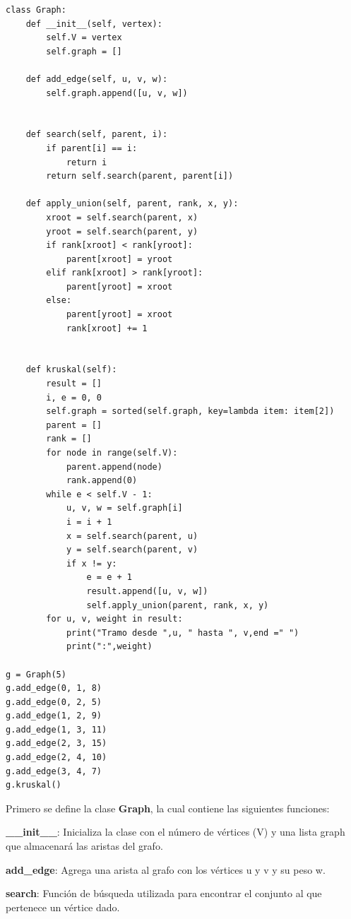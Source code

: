 \documentclass[12pt,a4paper]{article}
\begin{document}
\begin{lstlisting}[caption={Algoritmo de Kruskal en Python}, label={lst:python}]
    class Graph:
    def __init__(self, vertex):
        self.V = vertex
        self.graph = []
 
    def add_edge(self, u, v, w):
        self.graph.append([u, v, w])
 
 
    def search(self, parent, i):
        if parent[i] == i:
            return i
        return self.search(parent, parent[i])
 
    def apply_union(self, parent, rank, x, y):
        xroot = self.search(parent, x)
        yroot = self.search(parent, y)
        if rank[xroot] < rank[yroot]:
            parent[xroot] = yroot
        elif rank[xroot] > rank[yroot]:
            parent[yroot] = xroot
        else:
            parent[yroot] = xroot
            rank[xroot] += 1
 
  
    def kruskal(self):
        result = []
        i, e = 0, 0
        self.graph = sorted(self.graph, key=lambda item: item[2])
        parent = []
        rank = []
        for node in range(self.V):
            parent.append(node)
            rank.append(0)
        while e < self.V - 1:
            u, v, w = self.graph[i]
            i = i + 1
            x = self.search(parent, u)
            y = self.search(parent, v)
            if x != y:
                e = e + 1
                result.append([u, v, w])
                self.apply_union(parent, rank, x, y)
        for u, v, weight in result:
            print("Tramo desde ",u, " hasta ", v,end =" ")
            print(":",weight)
 
g = Graph(5)
g.add_edge(0, 1, 8)
g.add_edge(0, 2, 5)
g.add_edge(1, 2, 9)
g.add_edge(1, 3, 11)
g.add_edge(2, 3, 15)
g.add_edge(2, 4, 10)
g.add_edge(3, 4, 7)
g.kruskal()

\end{lstlisting}

Primero se define la clase \textbf{Graph}, la cual contiene las siguientes funciones:
\newline

\textbf{\_\_init\_\_}: Inicializa la clase con el número de vértices (V) y una lista graph que almacenará las aristas del grafo.
\newline

\textbf{add\_edge}: Agrega una arista al grafo con los vértices u y v y su peso w.
\newline

\textbf{search}: Función de búsqueda utilizada para encontrar el conjunto al que pertenece un vértice dado.
\newline
\end{document}
